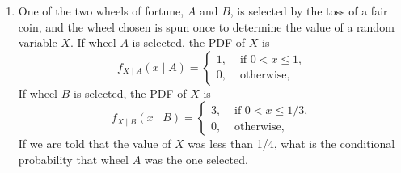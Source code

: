 \documentclass[paper=usletter, fontsize=12pt]{article}
\begin{document}
\begin{enumerate}
        \item One of the two wheels of fortune, $A$ and $B$, is selected by the
        toss of a fair coin, and the wheel chosen is spun once to determine the
        value of a random variable $X$. If wheel $A$ is selected, the PDF of
        $X$ is
        \begin{equation*}
            f_{X\mid A}(x\mid A) = \begin{cases}
                1, & \text{ if } 0 < x \le 1,\\
                0, & \text{ otherwise, }
            \end{cases}
        \end{equation*}
        If wheel $B$ is selected, the PDF of $X$ is
        \begin{equation*}
            f_{X\mid B}(x\mid B) = \begin{cases}
                3, & \text{ if } 0 < x \le 1/3,\\
                0, & \text{ otherwise, }
            \end{cases}
        \end{equation*}
        If we are told that the value of $X$ was less than 1/4, what is the
        conditional probability that wheel $A$ was the one selected.
        \begin{cproof}
        \end{cproof}

    \end{enumerate}
\end{document}

